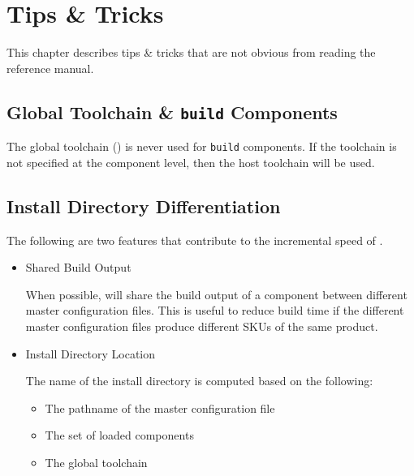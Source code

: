 %
%
%
%
\chapter{Tips \& Tricks}

This chapter describes tips \& tricks that are not obvious from
reading the reference manual.

\section{Global Toolchain \& \texttt{build} Components}

The global toolchain () is never used for
\texttt{build} components.  If the toolchain is not specified at the
component level, then the host toolchain will be used.

\section{Install Directory Differentiation}

The following are two features that contribute to the incremental
speed of \lmsbw.

\begin{itemize}
\item Shared Build Output

  When possible, \lmsbw will share the build output of a component
  between different master configuration files.  This is useful to
  reduce build time if the different master configuration files
  produce different SKUs of the same product.

\item Install Directory Location

  The name of the install directory is computed based on the
  following:

  \begin{itemize}
  \item{The pathname of the master configuration file}
  \item{The set of loaded components}
  \item{The global toolchain}
  \end{itemize}
\end{itemize}


